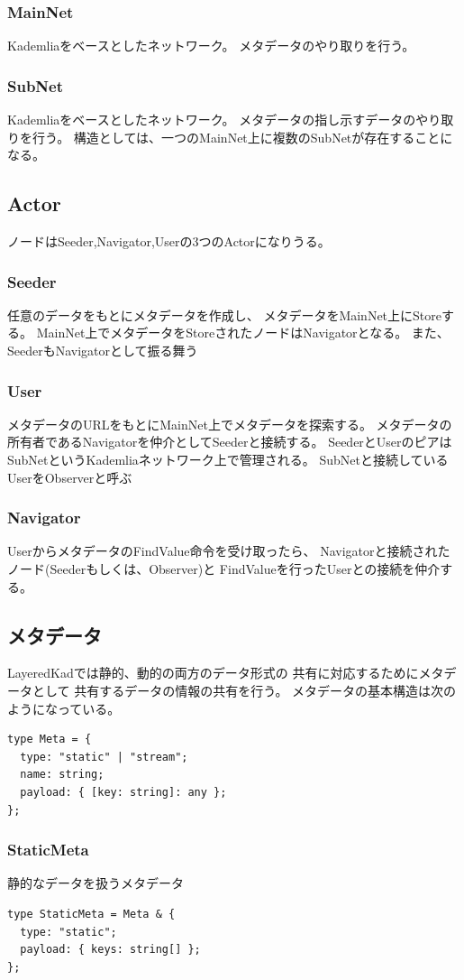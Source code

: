 \documentclass[sotsuron]{jcsie}
\begin{document}
\subsubsection{MainNet}
Kademliaをベースとしたネットワーク。
メタデータのやり取りを行う。
\subsubsection{SubNet}
Kademliaをベースとしたネットワーク。
メタデータの指し示すデータのやり取りを行う。
構造としては、一つのMainNet上に複数のSubNetが存在することになる。

\subsection{Actor}
ノードはSeeder,Navigator,Userの3つのActorになりうる。
\subsubsection{Seeder}
任意のデータをもとにメタデータを作成し、
メタデータをMainNet上にStoreする。
MainNet上でメタデータをStoreされたノードはNavigatorとなる。
また、SeederもNavigatorとして振る舞う
\subsubsection{User}
メタデータのURLをもとにMainNet上でメタデータを探索する。
メタデータの所有者であるNavigatorを仲介としてSeederと接続する。
SeederとUserのピアはSubNetというKademliaネットワーク上で管理される。
SubNetと接続しているUserをObserverと呼ぶ
\subsubsection{Navigator}
UserからメタデータのFindValue命令を受け取ったら、
Navigatorと接続されたノード(Seederもしくは、Observer)と
FindValueを行ったUserとの接続を仲介する。

\subsection{メタデータ}
LayeredKadでは静的、動的の両方のデータ形式の
共有に対応するためにメタデータとして
共有するデータの情報の共有を行う。
メタデータの基本構造は次のようになっている。
\begin{lstlisting}
type Meta = {
  type: "static" | "stream";
  name: string;
  payload: { [key: string]: any };
};
\end{lstlisting}
\subsubsection{StaticMeta}
静的なデータを扱うメタデータ
\begin{lstlisting}
type StaticMeta = Meta & {
  type: "static";
  payload: { keys: string[] };
};
\end{lstlisting}
\end{document}
